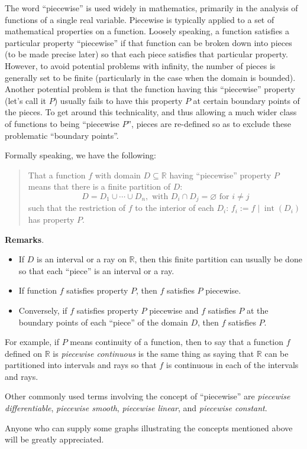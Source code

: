 \documentclass[12pt]{article}
\begin{document}
The word ``piecewise'' is used widely in mathematics, primarily in the analysis of functions of a single real variable.  Piecewise is typically applied to a set of mathematical properties on a function.  Loosely speaking, a function satisfies a particular property ``piecewise'' if that function can be broken down into pieces (to be made precise later) so that each piece satisfies that particular property.  However, to avoid potential problems with infinity, the number of pieces is generally set to be finite (particularly in the case when the domain is bounded).  Another potential problem is that the function having this ``piecewise'' property (let's call it $P$) usually fails to have this property $P$ at certain boundary points of the pieces.  To get around this technicality, and thus allowing a much wider class of functions to being ``piecewise $P$'', pieces are re-defined so as to exclude these problematic ``boundary points''.

Formally speaking, we have the following:

\begin{quote}
That a function $f$ with domain $D\subseteq \mathbb{R}$ having ``piecewise'' property $P$ means that there is a finite partition of $D$: 
$$D=D_1\cup\cdots\cup D_n,\mbox{ with }D_i\cap D_j=\varnothing\mbox{ for }i\neq j$$ 
such that the restriction of $f$ to the interior of each $D_i$: $f_i:=f\mid \operatorname{int}(D_i)$ has property $P$.
\end{quote}

\textbf{Remarks}.
\begin{itemize}
\item If $D$ is an interval or a ray on $\mathbb{R}$, then this finite partition can usually be done so that each ``piece'' is an interval or a ray.
\item If function $f$ satisfies property $P$, then $f$ satisfies $P$ piecewise.
\item Conversely, if $f$ satisfies property $P$ piecewise and $f$ satisfies $P$ at the boundary points of each ``piece'' of the domain $D$, then $f$ satisfies $P$.
\end{itemize}

For example, if $P$ means continuity of a function, then to say that a function $f$ defined on $\mathbb{R}$ is \emph{piecewise continuous} is the same thing as saying that $\mathbb{R}$ can be partitioned into intervals and rays so that $f$ is continuous in each of the intervals and rays.

Other commonly used terms involving the concept of ``piecewise'' are \emph{piecewise differentiable}, \emph{piecewise smooth}, \emph{piecewise linear}, and \emph{piecewise constant}.

Anyone who can supply some graphs illustrating the concepts mentioned above will be greatly appreciated.
\end{document}
